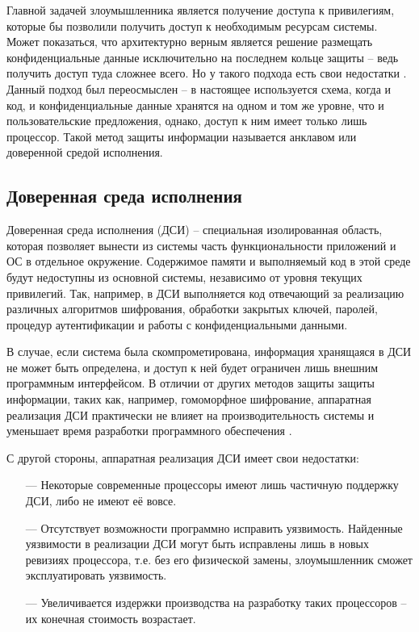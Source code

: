 Главной задачей злоумышленника является получение доступа к привилегиям, которые бы позволили получить доступ к необходимым ресурсам системы. Может показаться, что архитектурно верным является решение размещать конфиденциальные данные исключительно на последнем кольце защиты -- ведь получить доступ туда сложнее всего. Но у такого подхода есть свои недостатки \cite{complex-systems}. Данный подход был переосмыслен -- в настоящее используется схема, когда и код, и конфиденциальные данные хранятся на одном и том же уровне, что и пользовательские предложения, однако, доступ к ним имеет только лишь процессор. Такой метод защиты информации называется анклавом или доверенной средой исполнения.

\subsection{Доверенная среда исполнения}

Доверенная среда исполнения (ДСИ) -- специальная изолированная область,  которая позволяет вынести из системы часть функциональности приложений и ОС в отдельное окружение. Содержимое памяти и выполняемый код в этой среде будут недоступны из основной системы, независимо от уровня текущих привилегий. Так, например, в ДСИ выполняется код отвечающий за реализацию различных алгоритмов шифрования, обработки закрытых ключей, паролей, процедур аутентификации и работы с конфиденциальными данными. 

В случае, если система была скомпрометирована, информация хранящаяся в ДСИ не может быть определена, и доступ к ней будет ограничен лишь внешним программным интерфейсом. В отличии от других методов защиты защиты информации, таких как, например, гомоморфное шифрование, аппаратная реализация ДСИ практически не влияет на производительность системы и уменьшает время разработки программного обеспечения \cite{tee}.

С другой стороны, аппаратная реализация ДСИ имеет свои недостатки:

\begin{itemize}
	\item [---] Некоторые современные процессоры имеют лишь частичную поддержку ДСИ, либо не имеют её вовсе.
	\item [---] Отсутствует возможности программно исправить уязвимость. Найденные уязвимости в реализации ДСИ могут быть исправлены лишь в новых ревизиях процессора, т.е. без его физической замены, злоумышленник сможет эксплуатировать уязвимость.
	\item [---] Увеличивается издержки производства на разработку таких процессоров -- их конечная стоимость возрастает.
\end{itemize}

